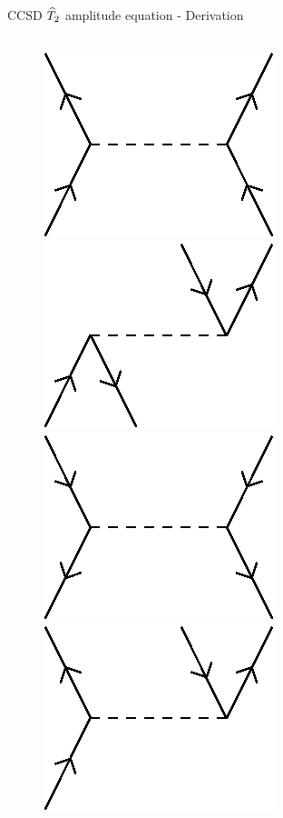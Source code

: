 \begin{frame}{CCSD $\widehat{T}_2$ amplitude equation - Derivation }
\begin{columns}[t]
\begin{figure}
        \parbox{0.20\textwidth}{
            \centering
            \includegraphics[scale=0.35]{graphics/v4}} 
        \parbox{0.20\textwidth}{
            \centering
            \includegraphics[scale=0.35]{graphics/v5}} 
        \parbox{0.20\textwidth}{
            \centering
            \includegraphics[scale=0.35]{graphics/v6}} 
        \parbox{0.20\textwidth}{
            \centering
            \includegraphics[scale=0.35]{graphics/v7}} 

\end{figure}
\end{columns}
\end{frame}
